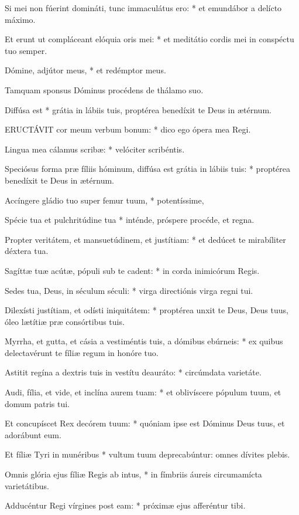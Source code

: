 Si mei non fúerint domináti, tunc immaculátus ero: * et emundábor a delícto máximo.

Et erunt ut compláceant elóquia oris mei: * et meditátio cordis mei in conspéctu tuo semper.

Dómine, adjútor meus, * et redémptor meus.

 Tamquam sponsus Dóminus procédens de thálamo suo.

 Diffúsa est * grátia in lábiis tuis, proptérea benedíxit te Deus in ætérnum.


\lettrine[lines=2]{E}{RUCTÁVIT} cor meum verbum bonum: * dico ego ópera mea Regi.

Lingua mea cálamus scribæ: * velóciter scribéntis.

Speciósus forma præ fíliis hóminum, diffúsa est grátia in lábiis tuis: * proptérea benedíxit te Deus in ætérnum.

Accíngere gládio tuo super femur tuum, * potentíssime,

Spécie tua et pulchritúdine tua * inténde, próspere procéde, et regna.

Propter veritátem, et mansuetúdinem, et justítiam: * et dedúcet te mirabíliter déxtera tua.

Sagíttæ tuæ acútæ, pópuli sub te cadent: * in corda inimicórum Regis.

Sedes tua, Deus, in séculum séculi: * virga directiónis virga regni tui.

Dilexísti justítiam, et odísti iniquitátem: * proptérea unxit te Deus, Deus tuus, óleo lætítiæ præ consórtibus tuis.

Myrrha, et gutta, et cásia a vestiméntis tuis, a dómibus ebúrneis: * ex quibus delectavérunt te fíliæ regum in honóre tuo.

Astitit regína a dextris tuis in vestítu deauráto: * circúmdata varietáte.

Audi, fília, et vide, et inclína aurem tuam: * et oblivíscere pópulum tuum, et domum patris tui.

Et concupíscet Rex decórem tuum: * quóniam ipse est Dóminus Deus tuus, et adorábunt eum.

Et fíliæ Tyri in munéribus * vultum tuum deprecabúntur: omnes dívites plebis.

Omnis glória ejus fíliæ Regis ab intus, * in fímbriis áureis circumamícta varietátibus.

Adducéntur Regi vírgines post eam: * próximæ ejus afferéntur tibi.

